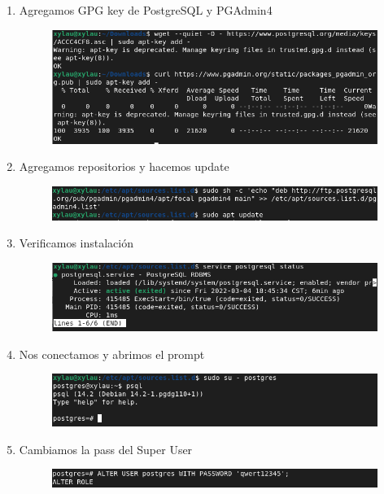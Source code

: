 \documentclass{exam}
\begin{document}
\begin{enumerate}
    \item Agregamos GPG key de PostgreSQL y PGAdmin4
    
    \begin{figure}[h]
        \centering
        \includegraphics[width = 15cm]{imgCardenas/1.png}
    \end{figure}
    
    \item Agregamos repositorios y hacemos update
    
    \begin{figure}[h]
        \centering
        \includegraphics[width = 15cm]{imgCardenas/2.png}
    \end{figure}
    \newpage
    \item Verificamos instalación
    
    \begin{figure}[ht]
        \centering
        \includegraphics[width = 15cm]{imgCardenas/3.png}
    \end{figure}
    
    \item Nos conectamos y abrimos el prompt
    
    \begin{figure}[h!]
        \centering
        \includegraphics[width = 15cm]{imgCardenas/4.png}
    \end{figure}
    
    \item Cambiamos la pass del Super User
    
    \begin{figure}[h!]
        \centering
        \includegraphics[width = 15cm]{imgCardenas/5.png}
    \end{figure}
    
\end{enumerate}
\end{document}
